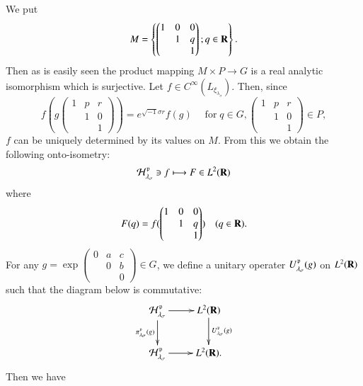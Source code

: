 We put
$$
M =\left\{\begin{pmatrix}
1 & 0 & 0 \\
  &  1 & q\\
  &    & 1
\end{pmatrix}
; q \in \mathbf{R} \right\}.
$$
Then as is easily seen the product mapping $M \times P \longrightarrow G$ is a real analytic isomorphism which is surjective. Let $f \in C^{\infty}(L_{\xi_{\lambda_{\sigma}}})$. Then, since
$$
f(g\begin{pmatrix}
1 & p & r \\
  &  1 & 0\\
  &    & 1
\end{pmatrix}
)= e^{\sqrt{-1}\sigma r} f(g) \quad\; \text{for}\; q \in G,  \begin{pmatrix}
1 & p & r \\
  &  1 & 0\\
  &    & 1
\end{pmatrix}
\in P,
$$
$f$ can be uniquely determined by its values on $M$. From this we obtain the following onto-isometry:
$$
\mathcal{H}_{\lambda_{\sigma}}^{\mathfrak{p}}\ni f \longmapsto F \in L^{2}(\mathbf{R})
$$
where
$$
F(q)=f(\begin{pmatrix}
1 & 0 & 0 \\
  &  1 & q\\
  &    & 1
\end{pmatrix}
) \quad (q \in \mathbf{R}).
$$
For any $g =\exp\begin{pmatrix}
0 & a & c\\
  & 0 & b\\
  &   & 0
\end{pmatrix}
\in G$, we define a unitary operater $U_{\lambda_{\sigma}}^{\mathfrak{p}}(g)$ on $L^{2}(\mathbf{R})$ such that the diagram below is commutative:
 $$
 \xymatrix{
\calH_{\lambda_{\sigma}}^{\fp}\ar[r]\ar [d]_-{\pi_{\lambda_{\sigma}}^{\fp}(g)} & L^{2}(\bR)\ar[d]^-{U_{\lambda_{\sigma}}^{\fp}(g)}\\
\calH_{\lambda_{\sigma}}^{\fp} \ar[r] & L^{2}(\bR).
} 
$$
Then we have
